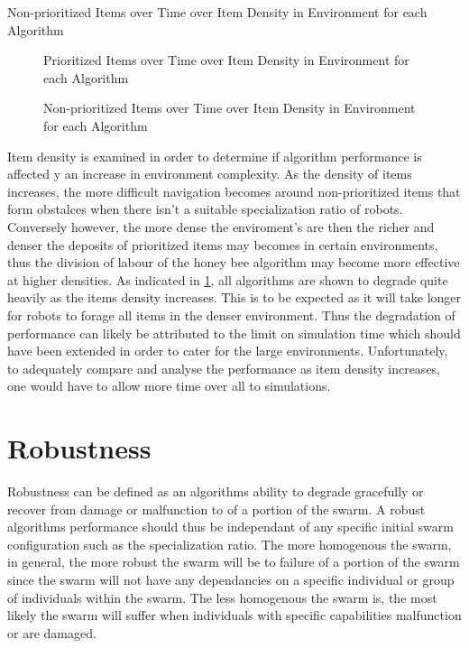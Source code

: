 \begin{table} [h]
     \caption{Non-prioritized Items over Time over Item Density in Environment for each Algorithm}
     \label{itemdensitynonprioritized}
	\centering
	\footnotesize
	
\end{table}


\begin{figure}[!htb]
\centering
\resizebox{\textwidth}{!}{}
\caption{Prioritized Items over Time over Item Density in Environment  for each Algorithm}
\label{objectgoldplot}
\end{figure}


\begin{figure}[!htb]
\centering
\resizebox{\textwidth}{!}{}
\caption{Non-prioritized Items over Time over Item Density in Environment for each Algorithm}
\label{objectwasteplot}
\end{figure}

Item density is examined in order to determine if algorithm performance is affected y an increase in environment complexity. As the density of items increases, the more difficult navigation becomes around non-prioritized items that form obstalces when there isn't a suitable specialization ratio of robots. Conversely however, the more dense the enviroment's are then the richer and denser the deposits of prioritized items may becomes in certain environments, thus the division of labour of the honey bee algorithm may become more effective at higher densities. As indicated in \ref{objectgoldplot}, all algorithms are shown to degrade quite heavily as the items density increases. This is to be expected as it will take longer for robots to forage all items in the denser environment. Thus the degradation of performance can likely be attributed to the limit on simulation time which should have been extended in order to cater for the large environments. Unfortunately, to adequately compare and analyse the performance as item density increases, one would have to allow more time over all to simulations.

\section{Robustness}
\label{results:robustness}

Robustness can be defined as an algorithms ability to degrade gracefully or recover from damage or malfunction to of a portion of the swarm. A robust algorithms performance should thus be independant of any specific initial swarm configuration such as the specialization ratio. The more homogenous the swarm, in general, the more robust the swarm will be to failure of a portion of the swarm since the swarm will not have any dependancies on a specific individual or group of individuals within the swarm. The less homogenous the swarm is, the most likely the swarm will suffer when individuals with specific capabilities malfunction or are damaged.

